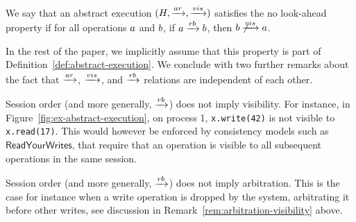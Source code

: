 \begin{definition}\label{def:no-look-ahead}
  We say that an abstract execution $(H,\xrightarrow{ar},\xrightarrow{vis})$ satisfies the no look-ahead property if for all operations $a$ and $b$, if $a\xrightarrow{rb}b$, then $b\not\xrightarrow{vis}a$.
\end{definition}

In the rest of the paper, we implicitly assume that this property is part of Definition~\ref{def:abstract-execution}.
We conclude with two further remarks about the fact that $\xrightarrow{ar}$, $\xrightarrow{vis}$, and $\xrightarrow{rb}$ relations are independent of each other.

\begin{remark}
  Session order (and more generally, $\xrightarrow{rb}$) does not imply visibility. For instance, in Figure~\ref{fig:ex-abstract-execution}, on process 1, \texttt{x.write(42)} is not visible to \texttt{x.read(17)}.
  This would however be enforced by consistency models such as $\mathsf{ReadYourWrites}$, that require that an operation is visible to all subsequent operations in the same session.
\end{remark}

\begin{remark}
  Session order (and more generally, $\xrightarrow{rb}$) does not imply arbitration. This is the case for instance when a write operation is dropped by the system, arbitrating it before other writes, see discussion in Remark~\ref{rem:arbitration-visibility} above.
\end{remark}